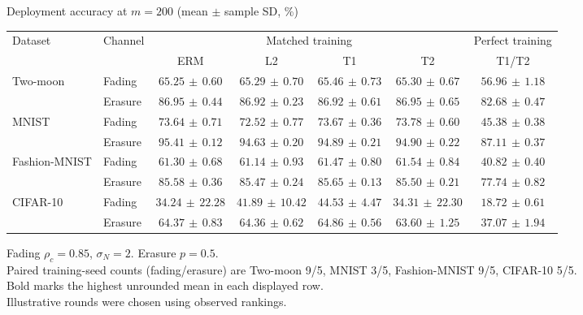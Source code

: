 \documentclass[border=4pt]{standalone}
\begin{document}
\begin{minipage}{7.8in}
\centering
Deployment accuracy at $m=200$ (mean $\pm$ sample SD, \%)\\[4pt]
\begin{tabular*}{\linewidth}{@{\extracolsep{\fill}}llccccc@{}}
\toprule
\multirow{2}{*}{Dataset} & \multirow{2}{*}{Channel} & \multicolumn{4}{c}{Matched training} & Perfect training \\
\cmidrule(lr){3-6}\cmidrule(l){7-7}
 & & ERM & L2 & T1 & T2 & T1/T2 \\
\midrule
\multirow{2}{*}{Two-moon} & Fading & $65.25\,\pm\,0.60$ & $65.29\,\pm\,0.70$ & $\mathbf{65.46}\,\pm\,0.73$ & $65.30\,\pm\,0.67$ & $56.96\,\pm\,1.18$ \\
 & Erasure & $86.95\,\pm\,0.44$ & $86.92\,\pm\,0.23$ & $86.92\,\pm\,0.61$ & $\mathbf{86.95}\,\pm\,0.65$ & $82.68\,\pm\,0.47$ \\
\midrule[0.25pt]
\multirow{2}{*}{MNIST} & Fading & $73.64\,\pm\,0.71$ & $72.52\,\pm\,0.77$ & $73.67\,\pm\,0.36$ & $\mathbf{73.78}\,\pm\,0.60$ & $45.38\,\pm\,0.38$ \\
 & Erasure & $\mathbf{95.41}\,\pm\,0.12$ & $94.63\,\pm\,0.20$ & $94.89\,\pm\,0.21$ & $94.90\,\pm\,0.22$ & $87.11\,\pm\,0.37$ \\
\midrule[0.25pt]
\multirow{2}{*}{Fashion-MNIST} & Fading & $61.30\,\pm\,0.68$ & $61.14\,\pm\,0.93$ & $61.47\,\pm\,0.80$ & $\mathbf{61.54}\,\pm\,0.84$ & $40.82\,\pm\,0.40$ \\
 & Erasure & $85.58\,\pm\,0.36$ & $85.47\,\pm\,0.24$ & $\mathbf{85.65}\,\pm\,0.13$ & $85.50\,\pm\,0.21$ & $77.74\,\pm\,0.82$ \\
\midrule[0.25pt]
\multirow{2}{*}{CIFAR-10} & Fading & $34.24\,\pm\,22.28$ & $41.89\,\pm\,10.42$ & $\mathbf{44.53}\,\pm\,4.47$ & $34.31\,\pm\,22.30$ & $18.72\,\pm\,0.61$ \\
 & Erasure & $64.37\,\pm\,0.83$ & $64.36\,\pm\,0.62$ & $\mathbf{64.86}\,\pm\,0.56$ & $63.60\,\pm\,1.25$ & $37.07\,\pm\,1.94$ \\
\bottomrule
\end{tabular*}
\par\smallskip\raggedright\footnotesize
Fading $\rho_c=0.85$, $\sigma_N=2$. Erasure $p=0.5$.\\
Paired training-seed counts (fading/erasure) are Two-moon 9/5, MNIST 3/5, Fashion-MNIST 9/5, CIFAR-10 5/5.\\
Bold marks the highest unrounded mean in each displayed row.\\
Illustrative rounds were chosen using observed rankings.
\end{minipage}
\end{document}
